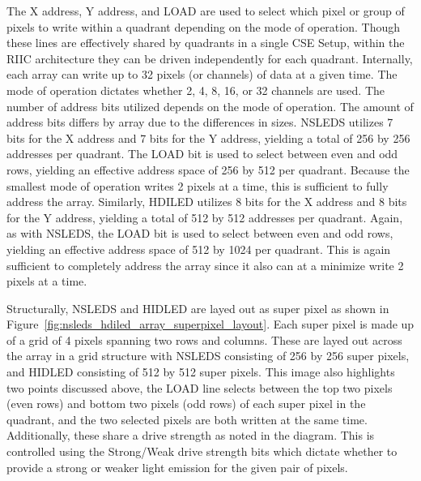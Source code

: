     The X address, Y address, and LOAD are used to select which pixel or group of pixels to write within a quadrant depending on the mode of operation. Though these lines are effectively shared by quadrants in a single CSE Setup, within the RIIC architecture they can be driven independently for each quadrant. Internally, each array can write up to 32 pixels (or channels) of data at a given time. The mode of operation dictates whether 2, 4, 8, 16, or 32 channels are used. The number of address bits utilized depends on the mode of operation. The amount of address bits differs by array due to the differences in sizes. NSLEDS utilizes 7 bits for the X address and 7 bits for the Y address, yielding a total of 256 by 256 addresses per quadrant. The LOAD bit is used to select between even and odd rows, yielding an effective address space of 256 by 512 per quadrant. Because the smallest mode of operation writes 2 pixels at a time, this is sufficient to fully address the array. Similarly, HDILED utilizes 8 bits for the X address and 8 bits for the Y address, yielding a total of 512 by 512 addresses per quadrant. Again, as with NSLEDS, the LOAD bit is used to select between even and odd rows, yielding an effective address space of 512 by 1024 per quadrant. This is again sufficient to completely address the array since it also can at a minimize write 2 pixels at a time.

    Structurally, NSLEDS and HIDLED are layed out as super pixel as shown in Figure~\ref{fig:nsleds_hdiled_array_superpixel_layout}. Each super pixel is made up of a grid of 4 pixels spanning two rows and columns. These are layed out across the array in a grid structure with NSLEDS consisting of 256 by 256 super pixels, and HIDLED consisting of 512 by 512 super pixels. This image also highlights two points discussed above, the LOAD line selects between the top two pixels (even rows) and bottom two pixels (odd rows) of each super pixel in the quadrant, and the two selected pixels are both written at the same time. Additionally, these share a drive strength as noted in the diagram. This is controlled using the Strong/Weak drive strength bits which dictate whether to provide a strong or weaker light emission for the given pair of pixels.

